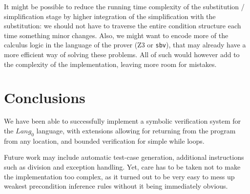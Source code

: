 \documentclass[a4paper]{article}
\begin{document}
It might be possible to reduce the running time complexity of the substitution / simplification stage by higher integration of the simplification with the substitution: we should not have to traverse the entire condition structure each time something minor changes. Also, we might want to encode more of the calculus logic in the language of the prover (Z3 or \texttt{sbv}), that may already have a more efficient way of solving these problems. All of such would however add to the complexity of the implementation, leaving more room for mistakes.

\section{Conclusions}
We have been able to successfully implement a symbolic verification system for the $\textit{Lang}_0$ language, with extensions allowing for returning from the program from any location, and bounded verification for simple while loops.

Future work may include automatic test-case generation, additional instructions such as division and exception handling. Yet, care has to be taken not to make the implementation too complex, as it turned out to be very easy to mess up weakest precondition inference rules without it being immediately obvious.
\end{document}
